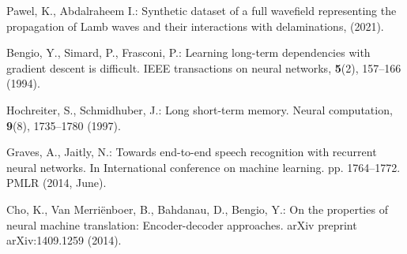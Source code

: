 \documentclass{IOS-Book-Article}
\begin{document}
\begin{thebibliography}{8}
	Pawel, K., Abdalraheem I.: Synthetic dataset of a full wavefield
	representing the propagation of Lamb waves and their interactions with
	delaminations, (2021).
	
	Bengio, Y., Simard, P., Frasconi, P.: Learning long-term dependencies with 
	gradient descent is difficult. IEEE transactions on neural networks, 
	\textbf{5}(2), 157--166 (1994).
	
	Hochreiter, S., Schmidhuber, J.: Long short-term memory. Neural computation, 
	\textbf{9}(8), 1735--1780 (1997).
	
	Graves, A., Jaitly, N.: Towards end-to-end speech recognition with recurrent 
	neural networks. In International conference on machine learning. pp. 
	1764--1772. PMLR (2014, June).
	
	Cho, K., Van Merriënboer, B., Bahdanau, D., Bengio, Y.: On the properties of 
	neural machine translation: Encoder-decoder approaches. arXiv preprint 
	arXiv:1409.1259  (2014).
	
\end{thebibliography}
\end{document}
